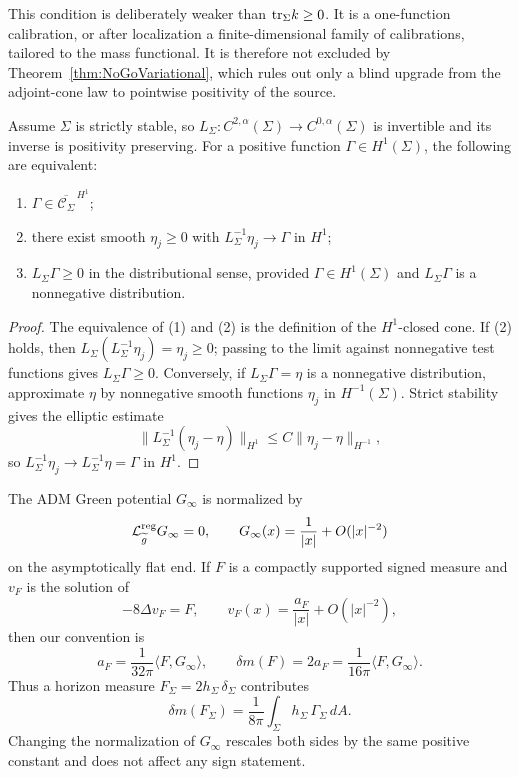\begin{remark}
This condition is deliberately weaker than \(\mathrm{tr}_\Sigma k\ge0\). It is a one-function calibration, or after localization a finite-dimensional family of calibrations, tailored to the mass functional. It is therefore not excluded by Theorem~\ref{thm:NoGoVariational}, which rules out only a blind upgrade from the adjoint-cone law to pointwise positivity of the source.
\end{remark}

\begin{lemma}\label{lem:ClosedConeEquiv37}
Assume \(\Sigma\) is strictly stable, so \(L_\Sigma:C^{2,\alpha}(\Sigma)\to C^{0,\alpha}(\Sigma)\) is invertible and its inverse is positivity preserving. For a positive function \(\Gamma\in H^1(\Sigma)\), the following are equivalent:
\begin{enumerate}
    \item \(\Gamma\in\overline{\mathcal C_\Sigma}^{\,H^1}\);
    \item there exist smooth \(\eta_j\ge0\) with \(L_\Sigma^{-1}\eta_j\to\Gamma\) in \(H^1\);
    \item \(L_\Sigma\Gamma\ge0\) in the distributional sense, provided \(\Gamma\in H^1(\Sigma)\) and \(L_\Sigma\Gamma\) is a nonnegative distribution.
\end{enumerate}
\end{lemma}

\begin{proof}
The equivalence of (1) and (2) is the definition of the \(H^1\)-closed cone. If (2) holds, then \(L_\Sigma(L_\Sigma^{-1}\eta_j)=\eta_j\ge0\); passing to the limit against nonnegative test functions gives \(L_\Sigma\Gamma\ge0\). Conversely, if \(L_\Sigma\Gamma=\eta\) is a nonnegative distribution, approximate \(\eta\) by nonnegative smooth functions \(\eta_j\) in \(H^{-1}(\Sigma)\). Strict stability gives the elliptic estimate
\[
    \|L_\Sigma^{-1}(\eta_j-\eta)\|_{H^1}
    \le C\|\eta_j-\eta\|_{H^{-1}},
\]
so \(L_\Sigma^{-1}\eta_j\to L_\Sigma^{-1}\eta=\Gamma\) in \(H^1\).
\end{proof}

\begin{definition}\label{def:ADMGreenNormalization37}
The ADM Green potential \(G_\infty\) is normalized by
\[
    \mathcal L_{\widetilde{g}}^{\mathrm{reg}}G_\infty=0,\qquad
    G_\infty(x)=\frac1{|x|}+O(|x|^{-2})
\]
on the asymptotically flat end. If \(F\) is a compactly supported signed measure and \(v_F\) is the solution of
\[
    -8\Delta v_F=F,\qquad v_F(x)=\frac{a_F}{|x|}+O(|x|^{-2}),
\]
then our convention is
\[
    a_F=\frac{1}{32\pi}\langle F,G_\infty\rangle,\qquad
    \delta m(F)=2a_F=\frac{1}{16\pi}\langle F,G_\infty\rangle .
\]
Thus a horizon measure \(F_\Sigma=2h_\Sigma\,\delta_\Sigma\) contributes
\[
    \delta m(F_\Sigma)=\frac{1}{8\pi}
    \int_\Sigma h_\Sigma\,\Gamma_\Sigma\,dA .
\]
Changing the normalization of \(G_\infty\) rescales both sides by the same positive constant and does not affect any sign statement.
\end{definition}

